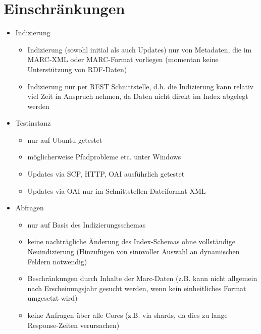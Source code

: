 \documentclass[10pt]{article}
\begin{document}
\section{Einschränkungen}
\begin{itemize}
	\item Indizierung
	\begin{itemize}
		\item Indizierung (sowohl initial als auch Updates) nur von Metadaten, die im MARC-XML oder MARC-Format vorliegen (momentan keine Unterstützung von RDF-Daten)
		\item Indizierung nur per REST Schnittstelle, d.h. die Indizierung kann relativ viel Zeit in Anspruch nehmen, da Daten nicht direkt im Index abgelegt werden
	\end{itemize}
	
	
	\item Testinstanz
	\begin{itemize}
		\item nur auf Ubuntu getestet
		\item möglicherweise Pfadprobleme etc. unter Windows
		\item Updates via SCP, HTTP, OAI ausführlich getestet
		\item Updates via OAI nur im Schnittstellen-Dateiformat XML
	\end{itemize}
	
	\item Abfragen
	\begin{itemize}
		\item nur auf Basis des Indizierungsschemas %
		\item keine nachträgliche Änderung des Index-Schemas ohne vollständige Neuindizierung (Hinzufügen von sinnvoller Auswahl an dynamischen Feldern notwendig)
		\item Beschränkungen durch Inhalte der Marc-Daten (z.B. kann nicht allgemein nach Erscheinungsjahr gesucht werden, wenn kein einheitliches Format umgesetzt wird)
		\item keine Anfragen über alle Cores (z.B. via shards, da dies zu lange Response-Zeiten verursachen)
		
	\end{itemize}
\end{itemize}
\end{document}
